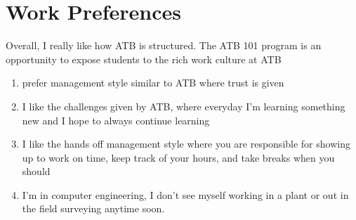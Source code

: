 \documentclass[letterpaper,12pt]{article}
\begin{document}

\section{Work Preferences}

Overall, I really like how ATB is structured. The ATB 101 program is an opportunity
to expose students to the rich work culture at ATB 


\begin{enumerate}
 \item prefer management style similar to ATB where trust is given
 \item I like the challenges given by ATB, where everyday I'm learning something new and I hope
       to always continue learning
 \item I like the hands off management style where you are responsible for showing up to work on time, keep track of your hours,
       and take breaks when you should
 \item I'm in computer engineering, I don't see myself working in a plant or out in the field surveying anytime soon.
\end{enumerate}



\nocite{*}

\end{document}
